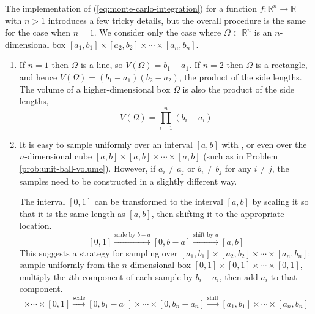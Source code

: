 The implementation of (\ref{eq:monte-carlo-integration}) for a function $f:\mathbb{R}^n\rightarrow\mathbb{R}$ with $n > 1$ introduces a few tricky details, but the overall procedure is the same for the case when $n=1$.
We consider only the case where $\Omega \subset \mathbb{R}^n$ is an $n$-dimensional box $[a_1,b_1]\times[a_2,b_2]\times\cdots\times[a_n,b_n]$.
\begin{enumerate}
\item
If $n=1$ then $\Omega$ is a line, so $V(\Omega) = b_1 - a_1$.
If $n=2$ then $\Omega$ is a rectangle, and hence $V(\Omega) = (b_1 - a_1)(b_2-a_2)$, the product of the side lengths.
The volume of a higher-dimensional box $\Omega$ is also the product of the side lengths,
\begin{equation}
V(\Omega) = \prod_{i=1}^n (b_i - a_i)
\label{eq:mc-box-volume}
\end{equation}

\item It is easy to sample uniformly over an interval $[a,b]$ with , or even over the $n$-dimensional cube $[a,b]\times[a,b]\times\cdots\times[a,b]$ (such as in Problem \ref{prob:unit-ball-volume}).
However, if $a_i \ne a_j$ or $b_i \ne b_j$ for any $i\ne j$, the samples need to be constructed in a slightly different way.

The interval $[0,1]$ can be transformed to the interval $[a,b]$ by scaling it so that it is the same length as $[a,b]$, then shifting it to the appropriate location.
\[[0,1]\xrightarrow{\text{scale by } b-a} [0,b-a] \xrightarrow{\text{shift by } a} [a,b]\]
This suggests a strategy for sampling over $[a_1,b_1]\times[a_2,b_2]\times\cdots\times[a_n,b_n]$: sample uniformly from the $n$-dimensional box $[0, 1]\times[0, 1]\times\cdots\times[0, 1]$, multiply the $i$th component of each sample by $b_i - a_i$, then add $a_i$ to that component.
\begin{equation}
[0, 1]\times\cdots\times[0, 1]
\xrightarrow{\text{scale}}
[0, b_1-a_1]\times\cdots\times[0, b_n-a_n]
\xrightarrow{\text{shift}}
[a_1,b_1]\times\cdots\times[a_n,b_n]
\label{eq:mc-domain-transform}
\end{equation}
\end{enumerate}

